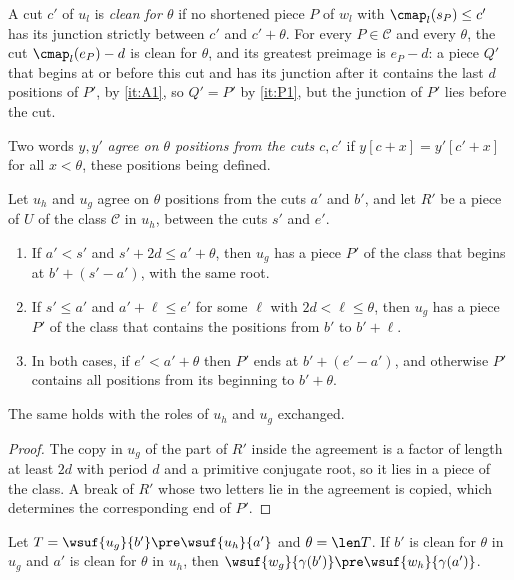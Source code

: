 A cut $c'$ of $u_l$ is \emph{clean for $\theta$} if no shortened piece $P$ of
$w_l$ with $\cmap_l(s_P)\le c'$ has its junction strictly between $c'$ and
$c'+\theta$. For every $P\in\mathcal C$ and every $\theta$, the cut $\cmap_l(e_P)-d$
is clean for $\theta$, and its greatest preimage is $e_P-d$: a piece $Q'$ that
begins at or before this cut and has its junction after it contains the
last $d$ positions of $P'$, by \ref{it:A1}, so $Q'=P'$ by \ref{it:P1}, but
the junction of $P'$ lies before the cut.

Two words $y,y'$ \emph{agree on $\theta$ positions from the cuts $c,c'$} if
$y[c+x]=y'[c'+x]$ for all $x<\theta$, these positions being defined.

\begin{lemma}\label{lem:copy}
Let $u_h$ and $u_g$ agree on $\theta$ positions from the cuts $a'$ and $b'$, and
let $R'$ be a piece of $U$ of the class $\mathcal C$ in $u_h$, between the
cuts $s'$ and $e'$.
\begin{enumerate}
\item\label{it:copy-start} If $a'<s'$ and $s'+2d\le a'+\theta$, then $u_g$ has a
  piece $P'$ of the class that begins at $b'+(s'-a')$, with the same root.
\item\label{it:copy-stretch} If $s'\le a'$ and $a'+\ell\le e'$ for some
  $\ell$ with $2d<\ell\le \theta$, then $u_g$ has a piece $P'$ of the class that
  contains the positions from $b'$ to $b'+\ell$.
\item\label{it:copy-end} In both cases, if $e'<a'+\theta$ then $P'$ ends at
  $b'+(e'-a')$, and otherwise $P'$ contains all positions from its
  beginning to $b'+\theta$.
\end{enumerate}
The same holds with the roles of $u_h$ and $u_g$ exchanged.
\end{lemma}

\begin{proof}
The copy in $u_g$ of the part of $R'$ inside the agreement is a factor of
length at least $2d$ with period $d$ and a primitive conjugate root, so it
lies in a piece of the class. A break of $R'$ whose two letters lie in the
agreement is copied, which determines the corresponding end of $P'$.
\end{proof}

\begin{lemma}\label{lem:clean}
Let $T=\wsuf{u_g}{b'}\pre\wsuf{u_h}{a'}$ and $\theta=\len T$. If $b'$ is clean
for $\theta$ in $u_g$ and $a'$ is clean for $\theta$ in $u_h$, then
$\wsuf{w_g}{\gamma(b')}\pre\wsuf{w_h}{\gamma(a')}$.
\end{lemma}

